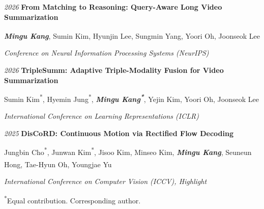\vspace{0.06cm}

\begin{samepage}
    \begin{publicationentry}{\textit{2026}}
        \textbf{From Matching to Reasoning: Query-Aware Long Video Summarization}
        \par\vspace{0.04cm}
        {\footnotesize \textbf{\textit{Mingu Kang}}, Sumin Kim, Hyunjin Lee, Sungmin Yang, Yoori Oh\textsuperscript{\dag}, Joonseok Lee\textsuperscript{\dag}}
    \end{publicationentry}
    \vspace{-0.05cm}
    \begin{onecolentry}
        \textit{Conference on Neural Information Processing Systems (NeurIPS)}
    \end{onecolentry}
\end{samepage}

\vspace{0.06cm}

\begin{samepage}
    \begin{publicationentry}{\textit{2026}}
        \textbf{TripleSumm: Adaptive Triple-Modality Fusion for Video Summarization}\href{https://smkim37.github.io/TripleSumm-page/}{}
        \par\vspace{0.04cm}
        {\footnotesize Sumin Kim\textsuperscript{*}, Hyemin Jung\textsuperscript{*}, \textbf{\textit{Mingu Kang\textsuperscript{*}}}, Yejin Kim, Yoori Oh\textsuperscript{\dag}, Joonseok Lee\textsuperscript{\dag}}
    \end{publicationentry}
    \vspace{-0.05cm}
    \begin{onecolentry}
        \textit{International Conference on Learning Representations (ICLR)}
    \end{onecolentry}
\end{samepage}

\vspace{0.06cm}

\begin{samepage}
    \begin{publicationentry}{\textit{2025}}
        \textbf{DisCoRD: Continuous Motion via Rectified Flow Decoding}\href{https://whwjdqls.github.io/discord-motion/}{}
        \par\vspace{0.04cm}
        {\footnotesize Jungbin Cho\textsuperscript{*}, Junwan Kim\textsuperscript{*}, Jisoo Kim, Minseo Kim, \textbf{\textit{Mingu Kang}}, Seuneun Hong\textsuperscript{\dag}, Tae-Hyun Oh\textsuperscript{\dag}, Youngjae Yu\textsuperscript{\dag}}
    \end{publicationentry}
    \vspace{-0.05cm}
    \begin{onecolentry}
        \textit{International Conference on Computer Vision (ICCV), Highlight}
    \end{onecolentry}
\end{samepage}

\vspace{0.06cm}

\begin{onecolentry}
    \textsuperscript{*}Equal contribution. \textsuperscript{\dag}Corresponding author.
\end{onecolentry}
